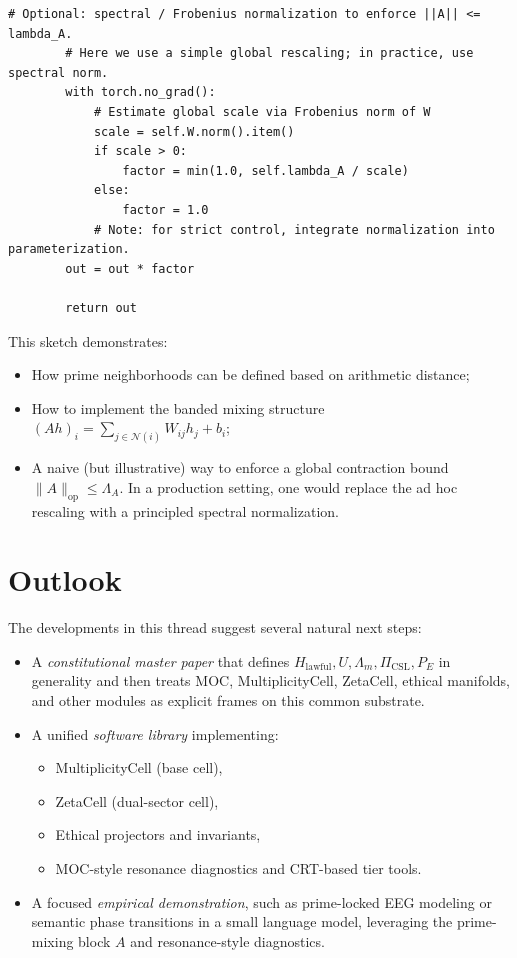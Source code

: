 \documentclass[11pt]{article}
\begin{document}
\begin{lstlisting}[style=pytorch, caption={Prime-mixing block $A$ in PyTorch-style pseudocode.}]
        # Optional: spectral / Frobenius normalization to enforce ||A|| <= lambda_A.
        # Here we use a simple global rescaling; in practice, use spectral norm.
        with torch.no_grad():
            # Estimate global scale via Frobenius norm of W
            scale = self.W.norm().item()
            if scale > 0:
                factor = min(1.0, self.lambda_A / scale)
            else:
                factor = 1.0
            # Note: for strict control, integrate normalization into parameterization.
        out = out * factor

        return out
\end{lstlisting}

This sketch demonstrates:
\begin{itemize}[leftmargin=1.5em]
  \item How prime neighborhoods can be defined based on arithmetic distance;
  \item How to implement the banded mixing structure \((A h)_i = \sum_{j \in \mathcal{N}(i)} W_{ij} h_j + b_i\);
  \item A naive (but illustrative) way to enforce a global contraction bound
  \(\|A\|_{\mathrm{op}} \le \Lambda_A\). In a production setting, one would
  replace the ad hoc rescaling with a principled spectral normalization.
\end{itemize}

\section{Outlook}

The developments in this thread suggest several natural next steps:
\begin{itemize}[leftmargin=1.5em]
  \item A \emph{constitutional master paper} that defines
  \(H_{\text{lawful}}, U, \Lambda_m, \Pi_{\text{CSL}}, P_E\) in generality and
  then treats MOC, MultiplicityCell, ZetaCell, ethical manifolds, and other
  modules as explicit frames on this common substrate.
  \item A unified \emph{software library} implementing:
  \begin{itemize}
    \item MultiplicityCell (base cell),
    \item ZetaCell (dual-sector cell),
    \item Ethical projectors and invariants,
    \item MOC-style resonance diagnostics and CRT-based tier tools.
  \end{itemize}
  \item A focused \emph{empirical demonstration}, such as prime-locked EEG
  modeling or semantic phase transitions in a small language model, leveraging
  the prime-mixing block \(A\) and resonance-style diagnostics.
\end{itemize}
\end{document}
